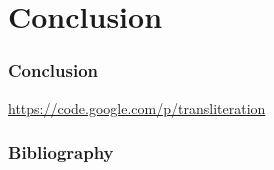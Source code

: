 \documentclass{beamer}
\begin{document}
\section{Conclusion}
\begin{frame}
\end{frame}

\begin{frame}
    \frametitle{Conclusion}
    \url{https://code.google.com/p/transliteration}
\end{frame}

\begin{frame}
    \frametitle{Bibliography}
    {\fontsize{0.8em}{1em}
    \nocite{*}
    
    }
\end{frame}
\end{document}
